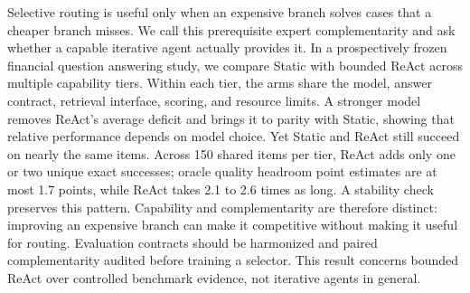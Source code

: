 Selective routing is useful only when an expensive branch solves cases that a
cheaper branch misses. We call this prerequisite expert complementarity and ask
whether a capable iterative agent actually provides it. In a prospectively
frozen financial question answering study, we compare Static with bounded ReAct
across multiple capability tiers. Within each tier, the arms share the model,
answer contract, retrieval interface, scoring, and resource limits. A stronger model removes
ReAct's average deficit and brings it to parity with Static, showing that
relative performance depends on model choice. Yet Static and ReAct still
succeed on nearly the same items. Across 150 shared items per tier, ReAct adds
only one or two unique exact successes; oracle quality headroom point estimates
are at most 1.7 points, while ReAct takes 2.1 to 2.6 times as long. A stability
check preserves this pattern.
Capability and complementarity are therefore distinct: improving an expensive
branch can make it competitive without making it useful for routing. Evaluation
contracts should be harmonized and paired complementarity audited before
training a selector. This result concerns bounded ReAct over controlled
benchmark evidence, not iterative agents in general.
